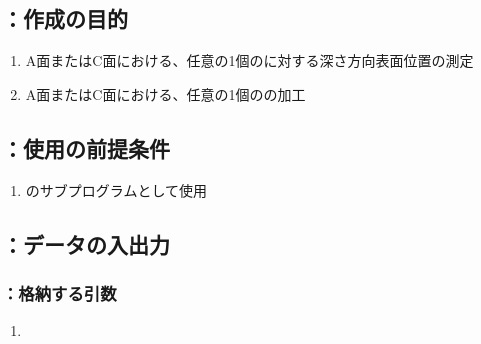 \clearpage


\subsection{\DMLthreeAC：作成の目的}
\begin{enumerate}[label*=\sarrow]
\item A面またはC面における、任意の1個の\Dimple に対する深さ方向表面位置の測定
\item A面またはC面における、任意の1個の\Dimple の加工
\end{enumerate}


\subsection{\DMLthreeAC：使用の前提条件}
\begin{enumerate}[label*=\sarrow]
\item \DLtwoAC のサブプログラムとして使用
\end{enumerate}


\subsection{\DMLthreeAC：データの入出力}

\subsubsection{\DMLthreeAC：格納する引数}
\begin{enumerate}[label*=\sarrow]
\item \PMACFaceSelectionFlag
\end{enumerate}

